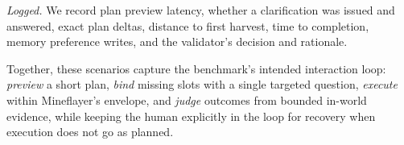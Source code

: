 \noindent\textit{Logged.}
We record plan preview latency, whether a clarification was issued and answered, exact plan deltas, distance to first harvest, time to completion, memory preference writes, and the validator’s decision and rationale.

\noindent
Together, these scenarios capture the benchmark’s intended interaction loop: \emph{preview} a short plan, \emph{bind} missing slots with a single targeted question, \emph{execute} within Mineflayer’s envelope, and \emph{judge} outcomes from bounded in-world evidence, while keeping the human explicitly in the loop for recovery when execution does not go as planned.








